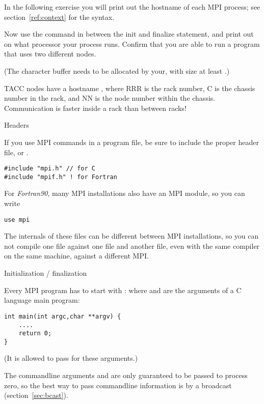 In the following exercise you will print out the hostname
of each MPI process; see section~\ref{ref:context} for the syntax.
\begin{exercise}
  \label{ex:procname}
  Now use the command 
  in between the
  init and finalize statement, and print out on what processor your process runs.
  Confirm that you are able to run a program that uses two different nodes.

  (The character buffer needs to be allocated by your, with size at
  least .)
\begin{tacc}
TACC nodes have a hostname , where RRR is the rack number, C is the chassis
number in the rack, and NN is the node number within the chassis. Communication
is faster inside a rack than between racks!
\end{tacc}
\end{exercise}

 {Headers}

If you use MPI commands in a program file, be sure to include
the proper header file,  or .
\begin{verbatim}
#include "mpi.h" // for C
#include "mpif.h" ! for Fortran
\end{verbatim}
For \emph{Fortran90}, many MPI installations
also have an MPI module, so you can write
\begin{verbatim}
use mpi
\end{verbatim}
The internals of these files can be different between MPI
installations, so you can not compile one file against one 
file and another file, even with the same compiler on the same machine,
against a different MPI.

 {Initialization / finalization}
\label{sec:mpi-init}

Every MPI program has to start with :
%
%
where  and  are the arguments
of a C language main program:
\begin{verbatim}
int main(int argc,char **argv) {
    ....
    return 0;
}
\end{verbatim}
(It is allowed to pass  for these arguments.)

The commandline arguments  and  are only guaranteed to
be passed to process zero, so the best way to pass commandline information
is by a broadcast (section~\ref{sec:bcast}).

